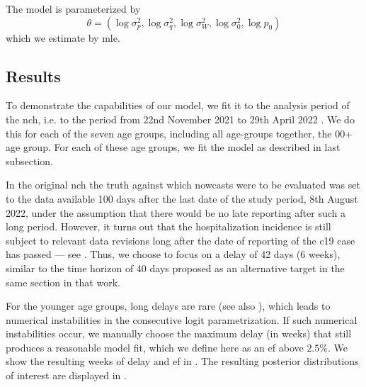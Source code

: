 The model is parameterized by 
$$
    \theta = \left( \log \sigma^{2}_{p}, \log \sigma_{q}^{2}, \log \sigma^{2}_W, \log \sigma^{2}_0, \log p_{0} \right)
$$
which we estimate by \gls{mle}. 



\subsection{Results}

To demonstrate the capabilities of our model, we fit it to the analysis period of the \gls{nch}, i.e. to the period from 22nd November 2021 to 29th April 2022 \citep{Wolffram2023Collaborative}. We do this for each of the seven age groups, including all age-groups together, the 00+ age group. 
For each of these age groups, we fit the model as described in last subsection. 

In the original \gls{nch} the truth against which nowcasts were to be evaluated was set to the data available 100 days after the last date of the study period, 8th August 2022, under the assumption that there would be no late reporting after such a long period. However, it turns out that the hospitalization incidence is still subject to relevant data revisions long after the date of reporting of the \gls{c19} case has passed --- see \citep[Section 3.7]{Wolffram2023Collaborative}. Thus, we choose to focus on a delay of 42 days (6 weeks), similar to the time horizon of 40 days proposed as an alternative target in the same section in that work. 

For the younger age groups, long delays are rare (see also ), which leads to numerical instabilities in the consecutive logit parametrization. If such numerical instabilities occur, we manually choose the maximum delay (in weeks) that still produces a reasonable model fit, which we define here as  an \gls{ef} above $2.5\%$. We show the resulting weeks of delay and \gls{ef} in . The resulting posterior distributions of interest are displayed in . 




